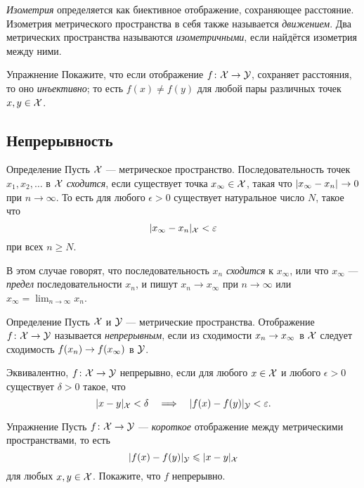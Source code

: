 \begin{multicols}{2}
{\emph{Изометрия} определяется как биективное отображение, сохраняющее расстояние.
Изометрия метрического пространства в себя также называется \emph{движением}.
Два метрических пространства называются \emph{изометричными}, если найдётся изометрия между ними.

\begin{thm}{Упражнение}\label{ex:dist-preserv=>injective}
Покажите, что если отображение $f\colon\mathcal{X}\to\mathcal{Y}$, сохраняет расстояния, то оно \emph{инъективно};
то есть $f(x)\ne f(y)$ для любой пары различных точек $x, y\in \mathcal{X}$.
\end{thm}


\subsection*{Непрерывность}

\begin{thm}{Определение}
Пусть ${\mathcal{X}}$ --- метрическое пространство.
Последовательность точек $x_1, x_2, \ldots$ в ${\mathcal{X}}$ \emph{сходится}, 
если существует точка $x_\infty\in {\mathcal{X}}$, такая что $\dist{x_\infty}{x_n}{}\to 0$ при $n\to\infty$.  
То есть для любого $\epsilon > 0$ существует натуральное число $N$, такое что 
\[
\dist{x_\infty}{x_n}{\spc{X}}
<
\epsilon
\]
при всех $n \ge N$.

В этом случае говорят, что последовательность $x_n$ \emph{сходится} к $x_\infty$, 
или что $x_\infty$ --- \emph{предел} последовательности $x_n$,
и пишут $x_n\to x_\infty$ при $n\to\infty$ или $x_\infty=\lim_{n\to\infty} x_n$.
\end{thm}

\begin{thm}{Определение}\label{def:continuous}
Пусть $\mathcal{X}$ и $\mathcal{Y}$ --- метрические пространства.
Отображение $f\colon\mathcal{X}\to \mathcal{Y}$ называется \emph{непрерывным}, если из сходимости $x_n\z\to x_\infty$ в ${\mathcal{X}}$
следует сходимость $f(x_n) \z\to f(x_\infty)$ в $\mathcal{Y}$.

Эквивалентно, $f\colon\mathcal{X}\to \mathcal{Y}$ непрерывно, если для любого $x\in {\mathcal{X}}$ и любого $\epsilon>0$
существует $\delta>0$ такое, что 
$$\dist{x}{y}{\spc{X}}<\delta\quad\Longrightarrow\quad \dist{f(x)}{f(y)}{\spc{Y}}<\epsilon.$$

\end{thm}

\begin{thm}{Упражнение}\label{ex:shrt=>continuous}
Пусть $f\:\spc{X}\z\to \spc{Y}$ --- \emph{короткое} отображение между метрическими пространствами, то есть
\[\dist{f(x)}{f(y)}{\spc{Y}}\le \dist{x}{y}{\spc{X}}\]
для любых $x,y\in \mathcal{X}$.
Покажите, что $f$ непрерывно.
\end{thm}

}
\end{multicols}
